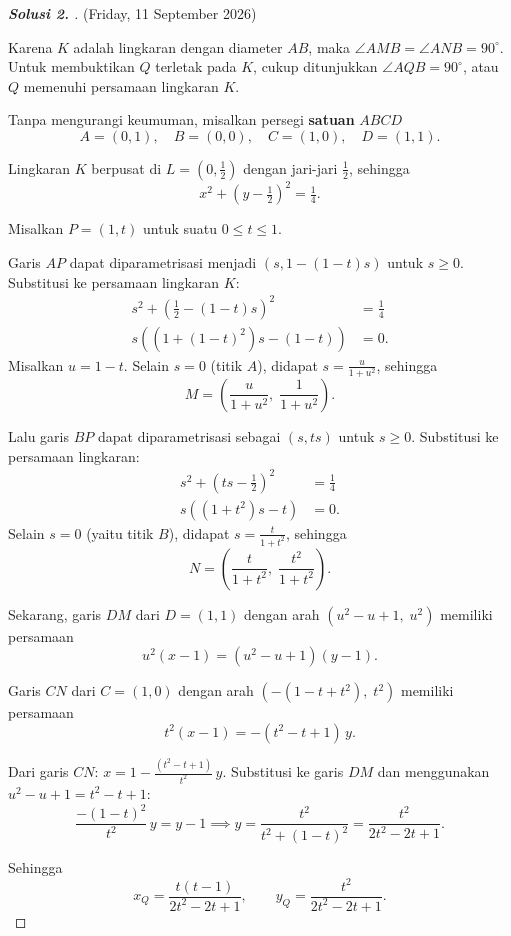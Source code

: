 \begin{proof}[\textbf{Solusi 2. }] (Friday, 11 September 2026) 

Karena $K$ adalah lingkaran dengan diameter $AB$, maka $\angle AMB = \angle ANB = 90^\circ$. Untuk membuktikan $Q$ terletak pada $K$, cukup ditunjukkan $\angle AQB = 90^\circ$, atau $Q$ memenuhi persamaan lingkaran $K$.

Tanpa mengurangi keumuman, misalkan persegi \textbf{satuan} $ABCD$
\[A=(0,1),\quad B=(0,0), \quad C=(1,0), \quad D=(1,1).\]

Lingkaran $K$ berpusat di $L=\left(0,\tfrac{1}{2}\right)$ dengan jari-jari $\tfrac{1}{2}$, sehingga
\[x^2+\left(y-\tfrac{1}{2}\right)^2=\tfrac{1}{4}.\]

Misalkan $P=(1,t)$ untuk suatu $0\le t\le 1$.

Garis $AP$ dapat diparametrisasi menjadi $(s, 1-(1-t)s)$ untuk $s\ge 0$. Substitusi ke persamaan lingkaran $K$:
\begin{align*}
    s^2 + \left(\tfrac{1}{2}-(1-t)s\right)^2 &= \tfrac{1}{4}\\
    s\left((1+(1-t)^2)s - (1-t)\right) &= 0.
\end{align*}
Misalkan $u = 1-t$. Selain $s=0$ (titik $A$), didapat $s = \frac{u}{1+u^2}$, sehingga
\[M = \left(\frac{u}{1+u^2},\; \frac{1}{1+u^2}\right).\]

Lalu garis $BP$ dapat diparametrisasi sebagai $(s, ts)$ untuk $s\ge 0$. Substitusi ke persamaan lingkaran:
\begin{align*}
    s^2 + \left(ts-\tfrac{1}{2}\right)^2 &= \tfrac{1}{4}\\
    s\left((1+t^2)s - t\right) &= 0.
\end{align*}
Selain $s=0$ (yaitu titik $B$), didapat $s = \frac{t}{1+t^2}$, sehingga
\[N = \left(\frac{t}{1+t^2},\; \frac{t^2}{1+t^2}\right).\]

Sekarang, garis $DM$ dari $D=(1,1)$ dengan arah $(u^2-u+1,\; u^2)$ memiliki persamaan
\[u^2(x-1) = (u^2-u+1)(y-1).\]

Garis $CN$ dari $C=(1,0)$ dengan arah $(-(1-t+t^2),\; t^2)$ memiliki persamaan
\[t^2(x-1) = -(t^2-t+1)\,y.\]

Dari garis $CN$: $x = 1 - \frac{(t^2-t+1)}{t^2}\,y$. Substitusi ke garis $DM$ dan menggunakan $u^2-u+1 = t^2-t+1$:
\[\frac{-(1-t)^2}{t^2}\,y = y-1 \implies y = \frac{t^2}{t^2+(1-t)^2} = \frac{t^2}{2t^2-2t+1}.\]

Sehingga
\[x_Q = \frac{t(t-1)}{2t^2-2t+1}, \qquad y_Q = \frac{t^2}{2t^2-2t+1}.\]


\end{proof}
